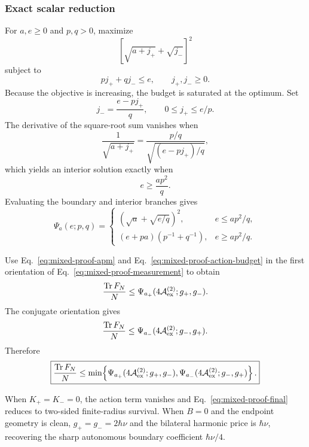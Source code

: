 \subsubsection{Exact scalar reduction}

For $a,e\ge0$ and $p,q>0$, maximize
\begin{equation}
\left[\sqrt{a+j_+}+\sqrt{j_-}\right]^2
\end{equation}
subject to
\begin{equation}
pj_+ +qj_-\le e,
\qquad j_+,j_-\ge0.
\end{equation}
Because the objective is increasing, the budget is saturated at the optimum. Set
\begin{equation}
j_-=\frac{e-pj_+}{q},
\qquad0\le j_+\le e/p.
\end{equation}
The derivative of the square-root sum vanishes when
\begin{equation}
\frac1{\sqrt{a+j_+}}
=\frac{p/q}{\sqrt{(e-pj_+)/q}},
\end{equation}
which yields an interior solution exactly when
\begin{equation}
e\ge\frac{ap^2}{q}.
\end{equation}
Evaluating the boundary and interior branches gives
\begin{equation}
\Psi_a(e;p,q)=
\begin{cases}
(\sqrt a+\sqrt{e/q})^2,&e\le ap^2/q,\\[1mm]
(e+pa)(p^{-1}+q^{-1}),&e\ge ap^2/q.
\end{cases}
\label{eq:mixed-proof-Psi}
\end{equation}

Use Eq.~\eqref{eq:mixed-proof-apm} and Eq.~\eqref{eq:mixed-proof-action-budget} in the first orientation of Eq.~\eqref{eq:mixed-proof-measurement} to obtain
\begin{equation}
\frac{\operatorname{Tr} F_N}{N}
\le
\Psi_{a_+}(4\mathcal A_{\rm ex}^{(2)};g_+,g_-).
\end{equation}
The conjugate orientation gives
\begin{equation}
\frac{\operatorname{Tr} F_N}{N}
\le
\Psi_{a_-}(4\mathcal A_{\rm ex}^{(2)};g_-,g_+).
\end{equation}
Therefore
\begin{equation}
\boxed{
\frac{\operatorname{Tr} F_N}{N}
\le
\min\!\left\{
\Psi_{a_+}(4\mathcal A_{\rm ex}^{(2)};g_+,g_-),
\Psi_{a_-}(4\mathcal A_{\rm ex}^{(2)};g_-,g_+)
\right\}.
}
\label{eq:mixed-proof-final}
\end{equation}

When $K_+=K_-=0$, the action term vanishes and Eq.~\eqref{eq:mixed-proof-final} reduces to two-sided finite-radius survival. When $B=0$ and the endpoint geometry is clean, $g_+=g_-=2\hbar\nu$ and the bilateral harmonic price is $\hbar\nu$, recovering the sharp autonomous boundary coefficient $\hbar\nu/4$.

